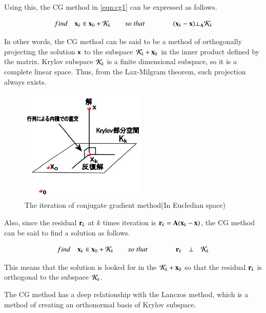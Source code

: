 Using this, the CG method in \eqref{eqn:cg1} can be expressed as follows.
%
\begin {screen}
\begin{equation}
find \quad 
\mathbf{x}_k\in\mathbf{x}_0+{\cal K}_k 
\qquad so\;that 
\qquad \qquad 
(\mathbf{x}_k-\mathbf{x})\bot_{\mathbf{A}}{\cal K}_k
\end{equation}
\end {screen}


In other words, the CG method can be said to be a method of orthogonally projecting the solution $\mathbf{x}$ to the subspace ${\cal K}_k+\mathbf{x}_0$ in the inner product defined by the matrix. Krylov subspace ${\cal K}_k$ is a finite dimensional subspace, so it is a complete linear space. Thus, from the Lax-Milgram theorem, such projection always exists.

\begin{figure}
\begin{center}
\includegraphics[width=6cm]{images/cg_projector.eps}
\caption{The iteration of conjugate gradient method(In Eucledian space)}
\end{center}
\end{figure}

Also, since the residual $\mathbf{r}_k$ at $k$ times iteration is $\mathbf{r}_k=\mathbf{A}(\mathbf{x}_k-\mathbf{x})$, the CG method can be said to find a solution as follows.

\begin{equation}
find \quad \mathbf{x}_k\in\mathbf{x}_0+{\cal K}_k 
\qquad 
so\;that
\qquad \qquad 
\mathbf{r}_k\quad\bot\quad{\cal K}_k
\end{equation}


This means that the solution  is looked for in the ${\cal K}_k+\mathbf{x}_0$ so that the residual $\mathbf{r}_k$ is orthogonal to the subspace ${\cal K}_k$.

The CG method has a deep relationship with the Lanczos method, which is a method of creating an orthonormal basis of Krylov subspace.



